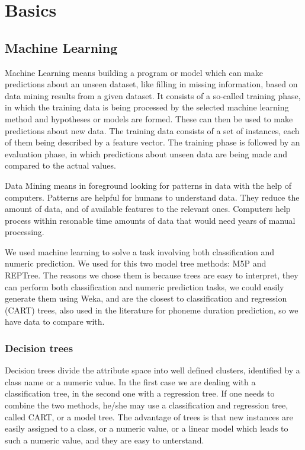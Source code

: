 \documentclass[a4paper]{scrreprt}
\begin{document}
\chapter{Basics}

\section{Machine Learning}
Machine Learning means building a program or model which can make predictions about an unseen dataset, like filling in missing information, based on data mining results from a given dataset. It consists of a so-called training phase, in which the training data is being processed by the selected machine learning method and hypotheses or models are formed. These can then be used to make predictions about new data. The training data consists of a set of instances, each of them being described by a feature vector. The training phase is followed by an evaluation phase, in which predictions about unseen data are being made and compared to the actual values. 

Data Mining means in foreground looking for patterns in data with the help of computers. Patterns are helpful for humans to understand data. They reduce the amount of data, and of available features to the relevant ones. Computers help process within resonable time amounts of data that would need years of manual processing.

We used machine learning to solve a task involving both classification and numeric prediction. We used for this two model tree methods: M5P and REPTree. The reasons we chose them is because trees are easy to interpret, they can perform both classification and numeric prediction tasks, we could easily generate them using Weka, and are the closest to classification and regression (CART) trees, also used in the literature \cite{Brinckmann2003} for phoneme duration prediction, so we have data to compare with.

\subsection{Decision trees}
Decision trees divide the attribute space into well defined clusters, identified by a class name or a numeric value. In the first case we are dealing with a classification tree, in the second one with a regression tree. If one needs to combine the two methods, he/she may use a classification and regression tree, called CART, or a model tree. The advantage of trees is that new instances are easily assigned to a class, or a numeric value, or a linear model which leads to such a numeric value, and they are easy to unterstand.
\end{document}
